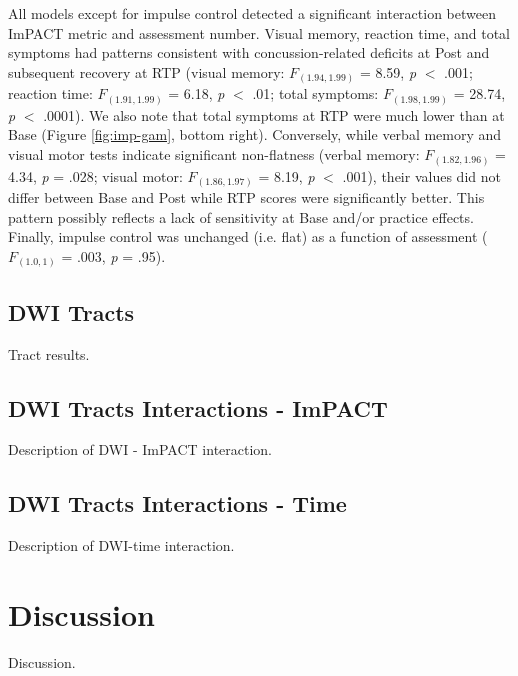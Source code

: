 \documentclass[12pt]{article}
\begin{document}
All models except for impulse control detected a significant interaction between ImPACT metric and assessment number. Visual memory, reaction time, and total symptoms had patterns consistent with concussion-related deficits at Post and subsequent recovery at RTP (visual memory: $F_{(1.94, 1.99)}$ = 8.59, \textit{p} $<$ .001; reaction time: $F_{(1.91, 1.99)}$ = 6.18, \textit{p} $<$ .01; total symptoms: $F_{(1.98, 1.99)}$ = 28.74, \textit{p} $<$ .0001). We also note that total symptoms at RTP were much lower than at Base (Figure \ref{fig:imp-gam}, bottom right). Conversely, while verbal memory and visual motor tests indicate significant non-flatness (verbal memory: $F_{(1.82, 1.96)}$ = 4.34, \textit{p} = .028; visual motor: $F_{(1.86, 1.97)}$ = 8.19, \textit{p} $<$ .001), their values did not differ between Base and Post while RTP scores were significantly better. This pattern possibly reflects a lack of sensitivity at Base and/or practice effects. Finally, impulse control was unchanged (i.e. flat) as a function of assessment ($F_{(1.0, 1)}$ = .003, \textit{p} = .95).


\subsection{DWI Tracts}
\label{ssec:res-dwi-tract}
Tract results.



\subsection{DWI Tracts Interactions - ImPACT}
\label{ssec:res-dwi-imp}
Description of DWI - ImPACT interaction.



\subsection{DWI Tracts Interactions - Time}
\label{ssec:res-dwi-time}
Description of DWI-time interaction.



\section{Discussion}
\label{sec:disc}
Discussion.

\end{document}

